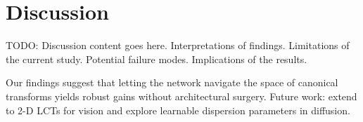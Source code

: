 \section{Discussion}
TODO: Discussion content goes here.
Interpretations of findings.
Limitations of the current study.
Potential failure modes.
Implications of the results.

Our findings suggest that letting the network navigate the space of canonical transforms yields robust gains without architectural surgery.  Future work: extend to 2-D LCTs for vision and explore learnable dispersion parameters in diffusion.